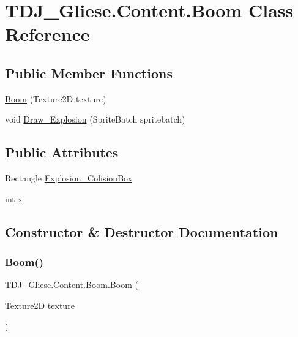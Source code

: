 \hypertarget{class_t_d_j___gliese_1_1_content_1_1_boom}{}\section{T\+D\+J\+\_\+\+Gliese.\+Content.\+Boom Class Reference}
\label{class_t_d_j___gliese_1_1_content_1_1_boom}
\subsection*{Public Member Functions}
\begin{DoxyCompactItemize}
\item 
\hyperlink{class_t_d_j___gliese_1_1_content_1_1_boom_aa0a4164c674f545a310cd04810f9921c}{Boom} (Texture2D texture)
\item 
void \hyperlink{class_t_d_j___gliese_1_1_content_1_1_boom_a0dee5bc9b3a9e2a8176658495c88d767}{Draw\+\_\+\+Explosion} (Sprite\+Batch spritebatch)
\end{DoxyCompactItemize}
\subsection*{Public Attributes}
\begin{DoxyCompactItemize}
\item 
Rectangle \hyperlink{class_t_d_j___gliese_1_1_content_1_1_boom_afa975637f7ec2c1ba606933f4760fd2a}{Explosion\+\_\+\+Colision\+Box}
\item 
int \hyperlink{class_t_d_j___gliese_1_1_content_1_1_boom_a4042341c8f48719db2c580130fa30cb3}{x}
\end{DoxyCompactItemize}


\subsection{Constructor \& Destructor Documentation}
\mbox{\label{class_t_d_j___gliese_1_1_content_1_1_boom_aa0a4164c674f545a310cd04810f9921c}} 
\subsubsection{\texorpdfstring{Boom()}{Boom()}}
{\footnotesize\ttfamily T\+D\+J\+\_\+\+Gliese.\+Content.\+Boom.\+Boom (\begin{DoxyParamCaption}\item[{Texture2D}]{texture }\end{DoxyParamCaption})}



